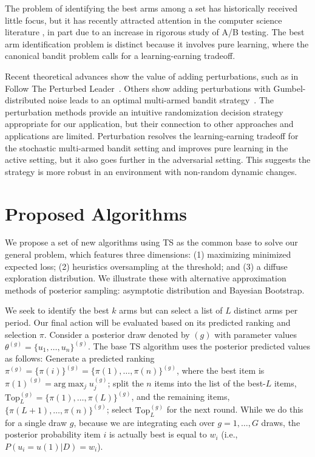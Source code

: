 \documentclass[a4paper,11pt]{article}
\newcommand{\numitems}{n}
\begin{document}
The problem of identifying the best arms among a set has historically received little focus, but it has recently attracted attention in the computer science literature \citep{gabillon2012best,kalyanakrishnan2012pac,kaufmann2016complexity,kaufmann2013information,russo2016simple}, in part due to an increase in rigorous study of A/B testing. The best arm identification problem is distinct because it involves pure learning, where the canonical bandit problem calls for a learning-earning tradeoff. 

Recent theoretical advances show the value of adding perturbations, such as in Follow The Perturbed Leader~\citep{kalai2005efficient}. Others show adding perturbations with Gumbel-distributed noise leads to an optimal multi-armed bandit strategy~\citep{abernethy2015fighting,kujala2005following}. The perturbation methods provide an intuitive randomization decision strategy appropriate for our application, but their connection to other approaches and applications are limited. Perturbation resolves the learning-earning tradeoff for the stochastic multi-armed bandit setting and improves pure learning in the active setting, but it also goes further in the adversarial setting. This suggests the strategy is more robust in an environment with non-random dynamic changes.

\section{Proposed Algorithms} 

We propose a set of new algorithms using TS as the common base to solve our general problem, which features three dimensions: (1) maximizing minimized expected loss; (2) heuristics oversampling at the threshold; and (3) a diffuse exploration distribution. We illustrate these with alternative approximation methods of posterior sampling: asymptotic distribution and Bayesian Bootstrap.

We seek to identify the best $k$ arms but can select a list of $L$ distinct arms per period. Our final action will be evaluated based on its predicted ranking and selection $\pi$. Consider a posterior draw denoted by $(g)$ with parameter values $\theta^{(g)} = \{u_1,\ldots,u_\numitems\}^{(g)}$. The base TS algorithm uses the posterior predicted values as follows: Generate a predicted ranking $\pi^{(g)} = \{\pi(i)\}^{(g)} = \{ \pi(1),\ldots,\pi(\numitems) \}^{(g)}$, where the best item is $\pi(1)^{(g)} = \text{arg}\max_{j} u_j^{(g)}$; split the $\numitems$ items into the list of the best-$L$ items, $\text{Top}_L^{(g)}=\{ \pi(1), \ldots,\pi(L) \}^{(g)}$, and the remaining items, $\{ \pi(L+1), \ldots,\pi(\numitems) \}^{(g)}$; select $\text{Top}_L^{(g)}$ for the next round. While we do this for a single draw $g$, because we are integrating each over $g=1,\ldots,G$ draws, the posterior probability item $i$ is actually best is equal to $w_i$ (i.e., $P( u_i = u(1) | D ) = w_i$). 
\end{document}
